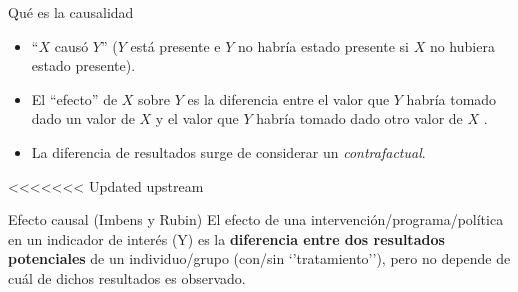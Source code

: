 \documentclass[
  ignorenonframetext,
]{beamer}
\begin{document}
\begin{frame}{Qué es la causalidad}
\protect\hypertarget{quuxe9-es-la-causalidad-1}{}
\begin{itemize}
\item
  ``\(X\) causó \(Y\)'' (\(Y\) está presente e \(Y\) no habría estado
  presente si \(X\) no hubiera estado presente). \pause
\item
  El ``efecto'' de \(X\) sobre \(Y\) es la diferencia entre el valor que
  \(Y\) habría tomado dado un valor de \(X\) y el valor que \(Y\) habría
  tomado dado otro valor de \(X\) . \pause
\item
  La diferencia de resultados surge de considerar un
  \emph{contrafactual}.
\end{itemize}
\end{frame}

<<<<<<< Updated upstream
\begin{frame}{Efecto causal (Imbens y Rubin)}
\protect\hypertarget{efecto-causal-imbens-y-rubin}{}
El efecto de una intervención/programa/política en un indicador de
interés (Y) es la \textbf{diferencia entre dos resultados potenciales}
de un individuo/grupo (con/sin `'tratamiento''), pero no depende de cuál
de dichos resultados es observado.
\end{frame}
\end{document}
